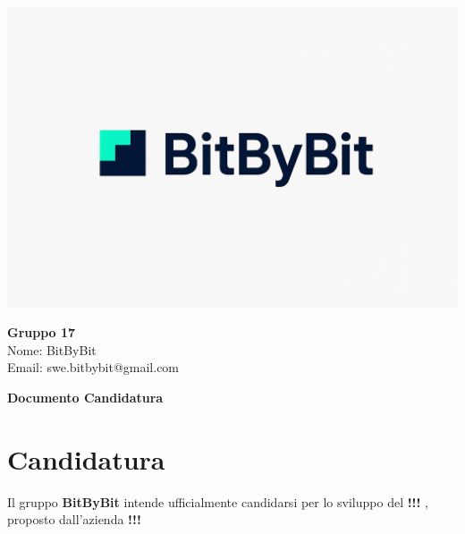 \documentclass[a4paper,12pt]{article}
\begin{document}
\begin{center}
    \begin{minipage}{0.25\textwidth}
        \centering
        \includegraphics[width=\linewidth]{logo.png}
    \end{minipage}
    \hfill
    \begin{minipage}{0.7\textwidth}
        \raggedright
        {\LARGE \textbf{Gruppo 17}}\\[0.3cm]
        {\large
        Nome: BitByBit\\
        Email: swe.bitbybit@gmail.com
        }
    \end{minipage}
\end{center}

\vspace{1.5cm}

\begin{center}
    {\LARGE \textbf{Documento Candidatura}}
\end{center}

\vspace*{\fill} %

\clearpage

\clearpage
\tableofcontents
\thispagestyle{empty} %
\clearpage

\section{Candidatura}

Il gruppo \textbf{BitByBit} intende ufficialmente candidarsi per lo sviluppo del \textbf{ !!! }, proposto dall’azienda \textbf{ !!! }
\end{document}

